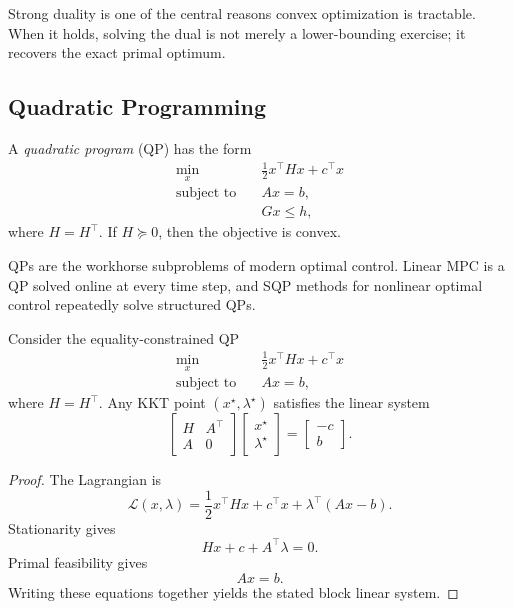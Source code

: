 \begin{remark}
	Strong duality is one of the central reasons convex optimization is tractable. When it holds, solving the dual is not merely a lower-bounding exercise; it recovers the exact primal optimum.
\end{remark}

\newpage

\subsection{Quadratic Programming}
\label{sec:l3-quadratic-programming}

\begin{definition}\label{def:l3-quadratic-program}
	A \emph{quadratic program} (QP) has the form
	\begin{align*}
		\min_x \quad & \frac{1}{2}x^\top Hx+c^\top x \\
		\text{subject to}\quad & Ax=b, \\
		                       & Gx\le h,
	\end{align*}
	where $H=H^\top$. If $H \succeq 0$, then the objective is convex.
\end{definition}

\begin{remark}
	QPs are the workhorse subproblems of modern optimal control. Linear MPC is a QP solved online at every time step, and SQP methods for nonlinear optimal control repeatedly solve structured QPs.
\end{remark}

\begin{proposition}\label{prop:l3-equality-constrained-qp-kkt-system}
	Consider the equality-constrained QP
	\begin{align*}
		\min_x \quad & \frac{1}{2}x^\top Hx+c^\top x \\
		\text{subject to}\quad & Ax=b,
	\end{align*}
	where $H=H^\top$. Any KKT point $(x^\star,\lambda^\star)$ satisfies the linear system
	\[
		\begin{bmatrix}
			H   & A^\top \\
			A   & 0
		\end{bmatrix}
		\begin{bmatrix}
			x^\star \\
			\lambda^\star
		\end{bmatrix}
		=
		\begin{bmatrix}
			-c \\
			b
		\end{bmatrix}.
	\]
\end{proposition}
\begin{proof}
	The Lagrangian is
	\[
		\mathcal{L}(x,\lambda)=\frac{1}{2}x^\top Hx+c^\top x+\lambda^\top(Ax-b).
	\]
	Stationarity gives
	\[
		Hx+c+A^\top \lambda=0.
	\]
	Primal feasibility gives
	\[
		Ax=b.
	\]
	Writing these equations together yields the stated block linear system.
\end{proof}

